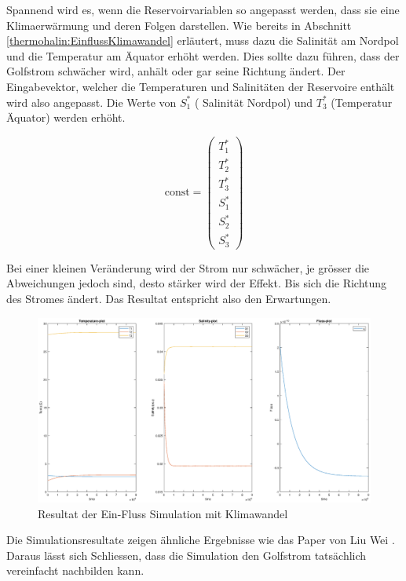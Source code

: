 Spannend wird es, wenn die Reservoirvariablen so angepasst werden, dass sie eine Klimaerwärmung und deren Folgen darstellen. Wie bereits in Abschnitt \ref{thermohalin:EinflussKlimawandel} erläutert, muss dazu die Salinität am Nordpol und die Temperatur am Äquator erhöht werden. Dies sollte dazu führen, dass der Golfstrom schwächer wird, anhält oder gar seine Richtung ändert. 
Der Eingabevektor, welcher die Temperaturen und Salinitäten der Reservoire enthält wird also angepasst.
Die Werte von $S_1^*$ ( Salinität Nordpol) und $T_3^*$ (Temperatur Äquator) werden erhöht.

\begin{equation*}
\text{const} = \begin{pmatrix}T_{1}^{*} \\ T_{2}^{*} \\ T_{3}^{*} \\ S_{1}^{*} \\ S_{2}^{*} \\ S_{3}^{*}\end{pmatrix}
\end{equation*}



Bei einer kleinen Veränderung wird der Strom nur schwächer, je grösser die Abweichungen jedoch sind, desto stärker wird der Effekt.
Bis sich die Richtung des Stromes ändert.
Das Resultat entspricht also den Erwartungen. 

\begin{figure}
	\centering
	\includegraphics[width=14cm]{thermohalin/Code/graphs/3b1f-skript-klimawandel.eps}
	\caption{Resultat der Ein-Fluss Simulation mit Klimawandel}
	\label{thermohalin:3b1f-skript-klimawandel}
\end{figure}
Die Simulationsresultate zeigen ähnliche Ergebnisse wie das Paper von Liu Wei \cite{thermohalin:liuwei}. Daraus lässt sich Schliessen, dass die Simulation den Golfstrom tatsächlich vereinfacht nachbilden kann.


